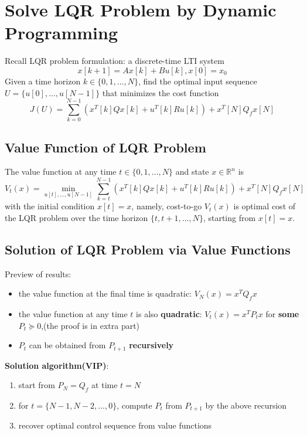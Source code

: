 \documentclass[10pt,a4paper,oneside]{article}
\begin{document}
\section{Solve LQR Problem by Dynamic Programming}
Recall LQR problem formulation: a discrete-time LTI system
\[
x[k+1]=Ax[k]+Bu[k],x[0]=x_0
\]
Given a time horizon $k\in\{0,1,...,N\}$, find the optimal input sequence $U=\{u[0],...,u[N-1]\}$ that minimizes the cost function
\[
J(U)=\sum_{k=0}^{N-1}(x^T[k] Q x[k]+u^T[k] R u[k])+x^T[N] Q_f x[N]
\]

\subsection{Value Function of LQR Problem}
The value function at any time $t\in\{0,1,...,N\}$ and state $x\in\mathbb{R}^n$ is
\[
V_t(x)=\min_{u[t],...,u[N-1]}\sum_{k=t}^{N-1}(x^T[k] Q x[k]+u^T[k] R u[k])+x^T[N] Q_f x[N]
\]
with the initial condition $x[t]=x$, namely, cost-to-go $V_t(x)$ is optimal cost of the LQR problem over the time horizon $\{t,t+1,...,N\}$, starting from $x[t]=x$.

\subsection{Solution of LQR Problem via Value Functions}
Preview of results:
\begin{itemize}
	\item the value function at the final time is quadratic: $V_N(x)=x^T Q_f x$
	\item the value function at any time $t$ is also \textbf{quadratic}: $V_t(x)=x^T P_t x$ for \textbf{some} $P_t \succeq 0$,(the proof is in extra part)
	\item $P_t$ can be obtained from $P_{t+1}$ \textbf{recursively}
\end{itemize}
\textbf{Solution algorithm(VIP)}:
\begin{enumerate}
	\item start from $P_N = Q_f$ at time $t=N$
	\item for $t = \{N-1, N-2, \dots, 0\}$, compute $P_t$ from $P_{t+1}$ by the above recursion
	\item recover optimal control sequence from value functions
\end{enumerate}
\end{document}
